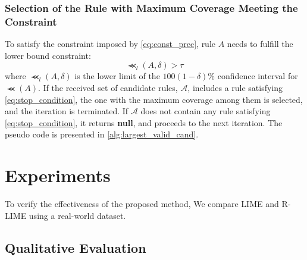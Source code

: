 \documentclass[runningheads]{llncs}
\begin{document}
\subsubsection{Selection of the Rule with Maximum Coverage Meeting the Constraint}
To satisfy the constraint imposed by \cref{eq:const_prec}, rule $A$ needs to fulfill the lower bound constraint:
\begin{equation}
	\Prec_{l}(A,\delta)>\tau
	\label{eq:stop_condition}
\end{equation}
where $\Prec_{l}(A,\delta)$ is the lower limit of
the $100(1-\delta)$\% confidence interval for $\Prec(A)$.
If the received set of candidate rules, $\mathcal{A}$,
includes a rule satisfying \cref{eq:stop_condition},
the one with the maximum coverage among them is selected,
and the iteration is terminated.
If $\mathcal{A}$ does not contain any rule satisfying \cref{eq:stop_condition},
it returns \textbf{null},
and proceeds to the next iteration.
The pseudo code is presented in \cref{alg:largest_valid_cand}.


\section{Experiments}
To verify the effectiveness of the proposed method,
We compare LIME and R-LIME using a real-world dataset.

\subsection{Qualitative Evaluation}
\end{document}
